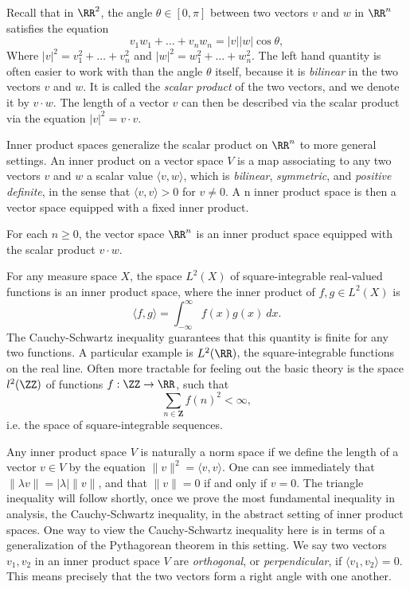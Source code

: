 Recall that in $\RR^2$, the angle $\theta \in [0,\pi]$ between two vectors $v$ and $w$ in $\RR^n$ satisfies the equation
%
\[ v_1w_1 + \dots + v_n w_n = |v||w| \cos \theta, \]
%
Where $|v|^2 = v_1^2 + \dots + v_n^2$ and $|w|^2 = w_1^2 + \dots + w_n^2$. The left hand quantity is often easier to work with than the angle $\theta$ itself, because it is \emph{bilinear} in the two vectors $v$ and $w$. It is called the \emph{scalar product} of the two vectors, and we denote it by $v \cdot w$. The length of a vector $v$ can then be described via the scalar product via the equation $|v|^2 = v \cdot v$.

Inner product spaces generalize the scalar product on $\RR^n$ to more general settings. An inner product on a vector space $V$ is a map associating to any two vectors $v$ and $w$ a scalar value $\langle v, w \rangle$, which is \emph{bilinear}, \emph{symmetric}, and \emph{positive definite}, in the sense that $\langle v, v \rangle > 0$ for $v \neq 0$. A n inner product space is then a vector space equipped with a fixed inner product.

\begin{example}
    For each $n \geq 0$, the vector space $\RR^n$ is an inner product space equipped with the scalar product $v \cdot w$.
\end{example}

\begin{example}
    For any measure space $X$, the space $L^2(X)$ of square-integrable real-valued functions is an inner product space, where the inner product of $f,g \in L^2(X)$ is
    \[ \langle f, g \rangle = \int_{-\infty}^\infty f(x) g(x)\ dx. \]
    The Cauchy-Schwartz inequality guarantees that this quantity is finite for any two functions. A particular example is $L^2(\RR)$, the square-integrable functions on the real line. Often more tractable for feeling out the basic theory is the space $l^2(\ZZ)$ of functions $f: \ZZ \to \RR$, such that
    \[ \sum_{n \in \mathbf{Z}} f(n)^2 < \infty, \]
    i.e. the space of square-integrable sequences.
\end{example}

Any inner product space $V$ is naturally a norm space if we define the length of a vector $v \in V$ by the equation $\| v \|^2 = \langle v, v \rangle$. One can see immediately that $\| \lambda v \| = |\lambda| \| v \|$, and that $\| v \| = 0$ if and only if $v = 0$. The triangle inequality will follow shortly, once we prove the most fundamental inequality in analysis, the Cauchy-Schwartz inequality, in the abstract setting of inner product spaces. One way to view the Cauchy-Schwartz inequality here is in terms of a generalization of the Pythagorean theorem in this setting. We say two vectors $v_1,v_2$ in an inner product space $V$ are \emph{orthogonal}, or \emph{perpendicular}, if $\langle v_1, v_2 \rangle = 0$. This means precisely that the two vectors form a right angle with one another.

